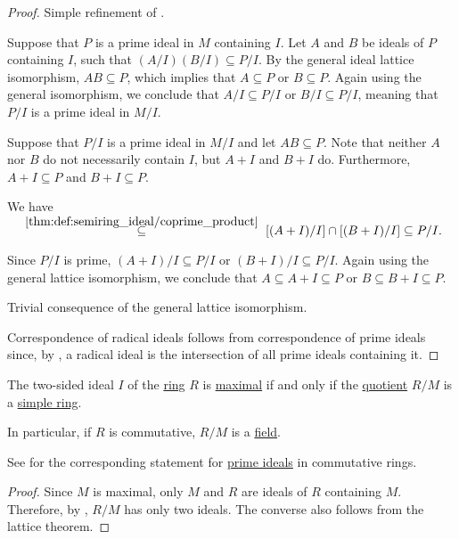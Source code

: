 \begin{proof}
   Simple refinement of .

  \SufficiencySubProof* Suppose that \( P \) is a prime ideal in \( M \) containing \( I \). Let \( A \) and \( B \) be ideals of \( P \) containing \( I \), such that \( (A / I) (B / I) \subseteq P / I \). By the general ideal lattice isomorphism, \( AB \subseteq P \), which implies that \( A \subseteq P \) or \( B \subseteq P \). Again using the general isomorphism, we conclude that \( A / I \subseteq P / I \) or \( B / I \subseteq P / I \), meaning that \( P / I \) is a prime ideal in \( M / I \).

  \NecessitySubProof* Suppose that \( P / I \) is a prime ideal in \( M / I \) and let \( AB \subseteq P \). Note that neither \( A \) nor \( B \) do not necessarily contain \( I \), but \( A + I \) and \( B + I \) do. Furthermore, \( A + I \subseteq P \) and \( B + I \subseteq P \).

  We have
  \begin{equation*}
    [(A + I) / I][(B + I) / I]
    \reloset {\ref{thm:def:semiring_ideal/coprime_product}} \subseteq
    [(A + I) / I] \cap [(B + I) / I]
    \subseteq
    P / I.
  \end{equation*}

  Since \( P / I \) is prime, \( (A + I) / I \subseteq P / I \) or \( (B + I) / I \subseteq P / I \). Again using the general lattice isomorphism, we conclude that \( A \subseteq A + I \subseteq P \) or \( B \subseteq B + I \subseteq P \).

   Trivial consequence of the general lattice isomorphism.

   Correspondence of radical ideals follows from correspondence of prime ideals since, by , a radical ideal is the intersection of all prime ideals containing it.
\end{proof}

\begin{corollary}\label{thm:quotient_by_maximal_ideal}
  The two-sided ideal \( I \) of the \hyperref[def:ring]{ring} \( R \) is \hyperref[def:semiring_ideal/maximal]{maximal} if and only if the \hyperref[def:ring/quotient]{quotient} \( R / M \) is a \hyperref[def:simple_object]{simple ring}.

  In particular, if \( R \) is commutative, \( R / M \) is a \hyperref[def:field]{field}.

  See  for the corresponding statement for \hyperref[def:semiring_ideal/prime]{prime ideals} in commutative rings.
\end{corollary}
\begin{proof}
  Since \( M \) is maximal, only \( M \) and \( R \) are ideals of \( R \) containing \( M \). Therefore, by , \( R / M \) has only two ideals. The converse also follows from the lattice theorem.
\end{proof}

